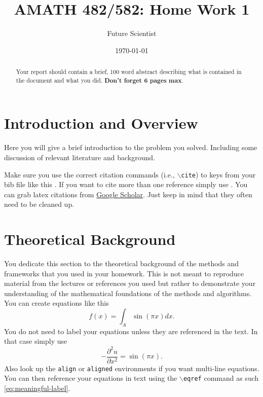 \documentclass[11pt]{amsart}
\title{AMATH 482/582: Home Work 1}
\author{Future Scientist} %
\date{\today} %
\begin{document}
\maketitle 

\begin{abstract}
    Your report should contain a brief, 100 word abstract describing what is contained in 
    the document and what you did. {\bf Don't forget 6 pages max}.
\end{abstract}


\section{Introduction and Overview}\label{sec:Introduction}

Here you will give a brief introduction to the problem you solved. Including 
some discussion of relevant literature and background. 

Make sure you use the correct citation commands (i.e., \texttt{$\backslash$cite}) to keys 
from your bib file like this \cite{example-article-citation}. If you want 
to cite more than one reference simply use \cite{example-article-citation, example-book-citation}. You can grab latex citations 
from \href{https://scholar.google.com}{Google Scholar}. Just keep in mind that they often 
need to be cleaned up.

\section{Theoretical Background}\label{sec:theory}

You dedicate this section to the theoretical background of the methods and frameworks 
that you used in your homework. This is not meant to reproduce material from the lectures
 or references you used but rather to demonstrate your understanding of the 
 mathematical foundations of the methods and algorithms. You can create equations like this 
 \begin{equation*}
     f(x) = \int_A \sin( \pi x) dx.
 \end{equation*}
 You do not need to label your equations unless they are referenced in the text. In that 
 case simply use 
 \begin{equation}\label{eq:meaningful-label}
      - \frac{\partial^2 u}{\partial x^2} = \sin ( \pi x).
 \end{equation}
Also look up the \texttt{align} or \texttt{aligned} environments if you want multi-line 
equations. You can then reference your equations in text using the $\backslash$\texttt{eqref}
command as such \eqref{eq:meaningful-label}. 
\end{document}
